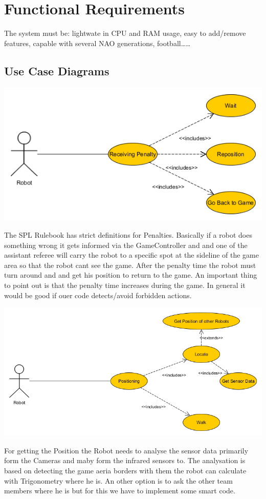 \documentclass[12pt]{article}
\theoremstyle{definition}
\begin{document}
\pagebreak
\section{Functional Requirements}
The system must be: lightwate in CPU and RAM usage, easy to add/remove features,  capable with several NAO generations, football……
\pagebreak
\subsection{Use Case Diagrams}
\begin{flushright}
\includegraphics[scale=.5]{Penalty.png}\\
\end{flushright}
The SPL Rulebook has strict definitions for Penalties. Basically if a robot does something wrong it gets informed via the GameController and and one of the assistant referee will carry the robot to a specific spot at the sideline of the game area so that the robot cant see the game. After the penalty time the robot must turn around and and get his position to return to the game. An important thing to point out is that the penalty time increases during the game.
In general it would be good if ouer code detects/avoid forbidden actions. 

\begin{flushright}
\includegraphics[scale=.5]{Positioning.png}\\
\end{flushright}
For getting the Position the Robot needs to analyse the sensor data primarily form the Cameras and maby form the infrared sensors to. The analysation is based on detecting the game aeria borders with them the robot can calculate with Trigonometry where he is. An other option is to ask the other team members where he is but for this we have to implement some smart code.
\end{document}
